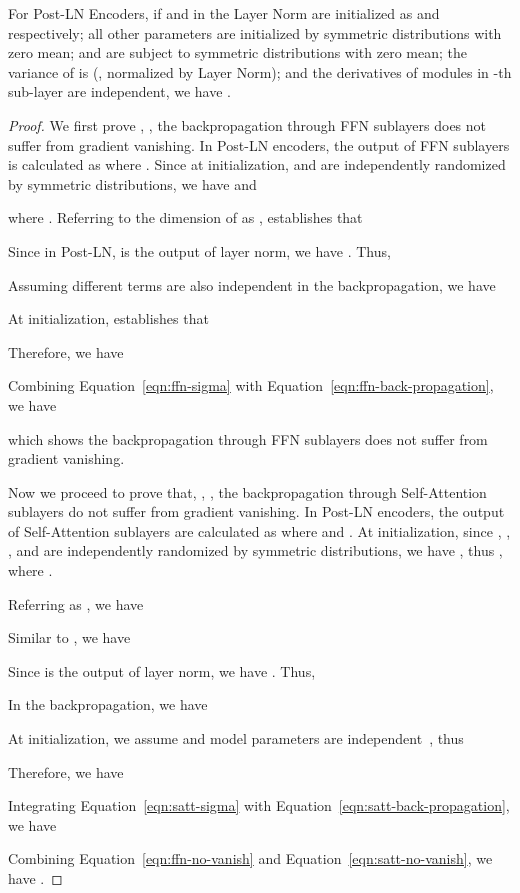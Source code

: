 \begin{theorem}
For Post-LN Encoders, if  and  in the Layer Norm are initialized as  and  respectively; all other parameters are initialized by symmetric distributions with zero mean;  and  are subject to symmetric distributions with zero mean; the variance of  is  (\ie, normalized by Layer Norm);  and the derivatives of modules in -th sub-layer are independent, we have .
\end{theorem}
\begin{proof}
We first prove , \ie, the backpropagation through FFN sublayers does not suffer from gradient vanishing. 
In Post-LN encoders, the output of FFN sublayers is calculated as  where .
Since at initialization,  and  are independently randomized by symmetric distributions, we have  and 
 
where . 
Referring to the dimension of  as , \citet{He2015DelvingDI} establishes that

Since in Post-LN,  is the output of layer norm, we have . 
Thus, 

Assuming different terms are also independent in the backpropagation, we have
 
At initialization, \citet{He2015DelvingDI} establishes that

Therefore, we have

Combining Equation~\ref{eqn:ffn-sigma} with Equation~\ref{eqn:ffn-back-propagation}, we have

which shows the backpropagation through FFN sublayers does not suffer from gradient vanishing. 

Now we proceed to prove that, , \ie, the backpropagation through Self-Attention sublayers do not suffer from gradient vanishing. 
In Post-LN encoders, the output of Self-Attention sublayers are calculated as 
 where  and . 
At initialization, since , , , and  are independently randomized by symmetric distributions, we have , thus , where .

Referring  as , we have 

Similar to \citet{He2015DelvingDI}, we have

Since  is the output of layer norm, we have . Thus, 

In the backpropagation, we have

At initialization, we assume  and model parameters are independent~\cite{He2015DelvingDI}, thus

Therefore, we have

Integrating Equation~\ref{eqn:satt-sigma} with Equation~\ref{eqn:satt-back-propagation}, we have

Combining Equation~\ref{eqn:ffn-no-vanish} and Equation~\ref{eqn:satt-no-vanish}, we have .
\end{proof}




